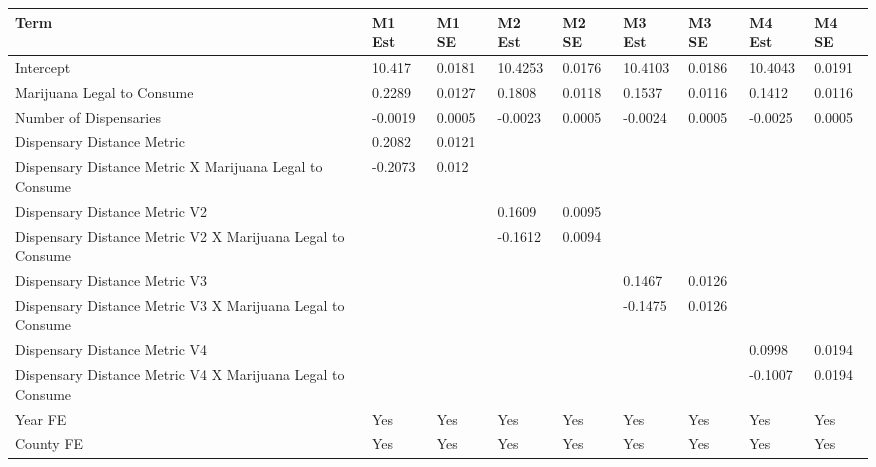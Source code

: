 \begin{tabular}{lllllllll}
  \hline
Term & M1 Est & M1 SE & M2 Est & M2 SE & M3 Est & M3 SE & M4 Est & M4 SE \\ 
  \hline
Intercept & 10.417 & 0.0181 & 10.4253 & 0.0176 & 10.4103 & 0.0186 & 10.4043 & 0.0191 \\ 
  Marijuana Legal to Consume & 0.2289 & 0.0127 & 0.1808 & 0.0118 & 0.1537 & 0.0116 & 0.1412 & 0.0116 \\ 
  Number of Dispensaries & -0.0019 & 0.0005 & -0.0023 & 0.0005 & -0.0024 & 0.0005 & -0.0025 & 0.0005 \\ 
  Dispensary Distance Metric & 0.2082 & 0.0121 &  &  &  &  &  &  \\ 
  Dispensary Distance Metric X Marijuana Legal to Consume & -0.2073 & 0.012 &  &  &  &  &  &  \\ 
  Dispensary Distance Metric V2 &  &  & 0.1609 & 0.0095 &  &  &  &  \\ 
  Dispensary Distance Metric V2 X Marijuana Legal to Consume &  &  & -0.1612 & 0.0094 &  &  &  &  \\ 
  Dispensary Distance Metric V3 &  &  &  &  & 0.1467 & 0.0126 &  &  \\ 
  Dispensary Distance Metric V3 X Marijuana Legal to Consume &  &  &  &  & -0.1475 & 0.0126 &  &  \\ 
  Dispensary Distance Metric V4 &  &  &  &  &  &  & 0.0998 & 0.0194 \\ 
  Dispensary Distance Metric V4 X Marijuana Legal to Consume &  &  &  &  &  &  & -0.1007 & 0.0194 \\ 
  Year FE & Yes & Yes & Yes & Yes & Yes & Yes & Yes & Yes \\ 
  County FE & Yes & Yes & Yes & Yes & Yes & Yes & Yes & Yes \\ 
   \hline
\end{tabular}
